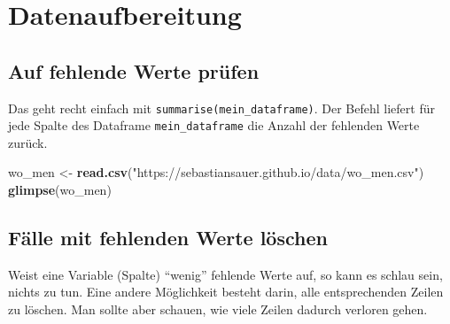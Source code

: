 \documentclass[12pt,ngerman,]{book}
\newenvironment{Shaded}{\begin{snugshade}}{\end{snugshade}}
\newcommand{\KeywordTok}[1]{\textcolor[rgb]{0.13,0.29,0.53}{\textbf{{#1}}}}
\newcommand{\StringTok}[1]{\textcolor[rgb]{0.31,0.60,0.02}{{#1}}}
\newcommand{\CommentTok}[1]{\textcolor[rgb]{0.56,0.35,0.01}{\textit{{#1}}}}
\newcommand{\NormalTok}[1]{{#1}}
\renewenvironment{Shaded}{\begin{kframe}}{\end{kframe}}
\begin{document}
\section{Datenaufbereitung}\label{datenaufbereitung}

\subsection{Auf fehlende Werte prüfen}\label{auf-fehlende-werte-prufen}

Das geht recht einfach mit \texttt{summarise(mein\_dataframe)}. Der
Befehl liefert für jede Spalte des Dataframe \texttt{mein\_dataframe}
die Anzahl der fehlenden Werte zurück.

\begin{Shaded}
\begin{Highlighting}[]
\NormalTok{wo_men <-}\StringTok{ }\KeywordTok{read.csv}\NormalTok{(}\StringTok{"https://sebastiansauer.github.io/data/wo_men.csv"}\NormalTok{)}
\KeywordTok{glimpse}\NormalTok{(wo_men)}
\end{Highlighting}
\end{Shaded}

\begin{Shaded}
\end{Shaded}

\subsection{Fälle mit fehlenden Werte
löschen}\label{falle-mit-fehlenden-werte-loschen}

Weist eine Variable (Spalte) ``wenig'' fehlende Werte auf, so kann es
schlau sein, nichts zu tun. Eine andere Möglichkeit besteht darin, alle
entsprechenden Zeilen zu löschen. Man sollte aber schauen, wie viele
Zeilen dadurch verloren gehen.
\end{document}
